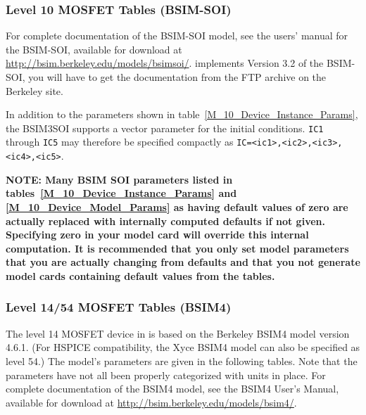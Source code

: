 \clearpage
\subsubsection{Level 10 MOSFET Tables (BSIM-SOI)}
For complete documentation of the BSIM-SOI model, see the users' manual
for the BSIM-SOI, available for download at
\url{http://bsim.berkeley.edu/models/bsimsoi/}.
\Xyce{} implements Version 3.2 of the BSIM-SOI, you will have to get the
documentation from the FTP archive on the Berkeley site.

In addition to the parameters shown in table~\ref{M_10_Device_Instance_Params}, 
the BSIM3SOI supports a vector parameter for the initial conditions.    \texttt{IC1} through \texttt{IC5}
may therefore be specified compactly as \texttt{IC=<ic1>,<ic2>,<ic3>, <ic4>,<ic5>}.

\textbf{NOTE:  Many BSIM SOI parameters listed in
tables~\ref{M_10_Device_Instance_Params} and \ref{M_10_Device_Model_Params} as
having default values of zero are actually replaced with internally computed
defaults if not given.  Specifying zero in your model card will override this
internal computation.  It is recommended that you only set model parameters
that you are actually changing from defaults and that you not generate model
cards containing default values from the tables.}



\clearpage
\subsubsection{Level 14/54 MOSFET Tables (BSIM4)}
The level 14 MOSFET device in \Xyce{} is based on the Berkeley BSIM4 model
version 4.6.1.  (For HSPICE compatibility, the Xyce BSIM4 model can also be
specified as level 54.)  The model's parameters are given in the following
tables.  Note that the parameters have not all been properly categorized with
units in place.  For complete documentation of the BSIM4 model, see the BSIM4
User’s Manual, available for download at
\url{http://bsim.berkeley.edu/models/bsim4/}.




\clearpage
